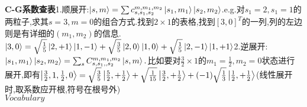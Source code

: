 \documentclass[UTF8,a4paper,7pt,twocolumn]{ctexart}
\begin{document}
      \textbf{C-G系数查表}1.顺展开:$\Ket{s,m}=\sum c_{s,s_{1},s_{2}}^{m,m_{1},m_{2}}\Ket{s_{1},m_{1}}\Ket{s_{2},m_{2}}$.e.g.对$s_{1}=2,s_{1}=1$的两粒子,求其$s=3,m=0$的组合方式.找到$2\times 1$的表格,找到$[3,0]^{T}$的一列,列的左边则是有详细的$(m_1,m_2)$的信息.$\Ket{3,0}=\sqrt{\frac{1}{5}}\Ket{2,+1}\Ket{1,-1}+\sqrt{\frac{3}{5}}\Ket{2,0}\Ket{1,0}+\sqrt{\frac{1}{5}}\Ket{2,-1}\Ket{1,+1}$2.逆展开:$\Ket{s_{1},m_{1}}\Ket{s_{2},m_{2}}=\sum_{s}C_{s,s_{1},,s_{2}}^{m,m_{1},m_{2}}\Ket{s,m}.$比如要对$\frac{3}{2}\times 1$的$m_{1}=\frac{1}{2},m_{2}=0$状态进行展开,即有$\Ket{\frac{3}{2},1,\frac{1}{2},0}=\sqrt{\frac{3}{5}}\Ket{\frac{5}{2},+\frac{1}{2}}+\sqrt{\frac{1}{15}}\Ket{\frac{3}{2},+\frac{1}{2}}+(-1)\sqrt{\frac{1}{3}}\Ket{\frac{1}{2},+\frac{1}{2}}$(线性展开时,取系数应开根,符号在根号外)\\
    $Vocabulary$\\
\end{document}
